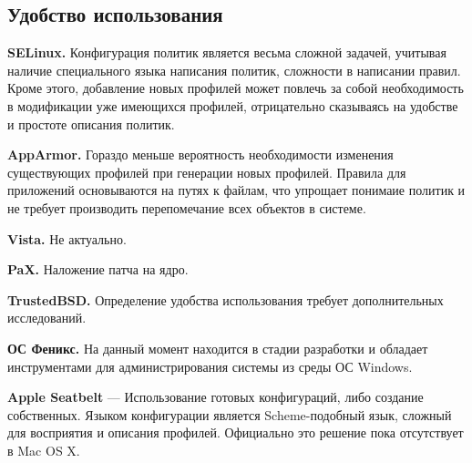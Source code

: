 
\bigskip
\subsection{Удобство использования}

\bigskip
{\bfseries SELinux.} Конфигурация политик является 
весьма сложной задачей, учитывая наличие специального
языка написания политик, сложности в написании правил.
Кроме этого, добавление новых профилей может повлечь 
за собой необходимость в модификации уже имеющихся 
профилей, отрицательно сказываясь на удобстве и 
простоте описания политик. 

\bigskip
{\bfseries AppArmor.} Гораздо меньше вероятность 
необходимости изменения существующих профилей при 
генерации новых профилей. Правила для приложений 
основываются на путях к файлам, что упрощает понимаие 
политик и не требует производить перепомечание всех 
объектов в системе. 

\bigskip
{\bfseries Vista.} Не актуально. 

\bigskip
{\bfseries PaX.} Наложение патча на ядро. 

\bigskip
{\bfseries TrustedBSD.} Определение удобства 
использования требует дополнительных исследований. 

\bigskip
{\bfseries ОС Феникс.} На данный момент находится
в стадии разработки и обладает инструментами для 
администрирования системы из среды ОС Windows. 

{\bfseries Apple Seatbelt} — Использование готовых 
конфигураций, либо создание собственных. Языком 
конфигурации является Scheme-подобный язык, сложный 
для восприятия и описания профилей. Официально это 
решение пока отсутствует в Mac OS X.

